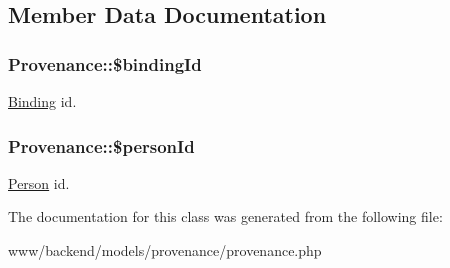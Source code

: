 \subsection{Member Data Documentation}
\hypertarget{classProvenance_a908380e16902473484d18fc79fa65290}{
\subsubsection[{\$bindingId}]{\setlength{\rightskip}{0pt plus 5cm}Provenance::\$bindingId}}
\label{classProvenance_a908380e16902473484d18fc79fa65290}
\hyperlink{classBinding}{Binding} id. \hypertarget{classProvenance_a0f541d6de88ef1a2c57a0aa462fcdc8b}{
\subsubsection[{\$personId}]{\setlength{\rightskip}{0pt plus 5cm}Provenance::\$personId}}
\label{classProvenance_a0f541d6de88ef1a2c57a0aa462fcdc8b}
\hyperlink{classPerson}{Person} id. 

The documentation for this class was generated from the following file:\begin{DoxyCompactItemize}
\item 
www/backend/models/provenance/provenance.php\end{DoxyCompactItemize}
